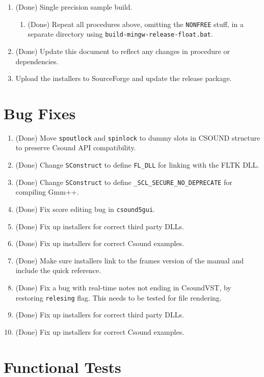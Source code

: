 \documentclass[11pt,letterpaper,onecolumn]{scrartcl}
\begin{document}
\begin{sloppypar}
\begin{enumerate}
\begin{enumerate}
\begin{enumerate}
				\end{enumerate}
			\item (Done) Single precision sample build.			
				\begin{enumerate}
					\item (Done) Repeat all procedures above, omitting the \verb|NONFREE| stuff, in a separate directory using \texttt{build-mingw-release-float.bat}. 
				\end{enumerate}
	    \item (Done) Update this document to reflect any changes in procedure or dependencies. 
	    \item Upload the installers to SourceForge and update the release package.
		\end{enumerate}
 \end{enumerate}

\section{Bug Fixes}
\label{sec:BugFixes}

\begin{enumerate}
	\item (Done) Move \texttt{spoutlock} and \texttt{spinlock} to dummy slots in CSOUND structure to preserve Csound API compatibility.
	\item (Done) Change \texttt{SConstruct} to define \verb|FL_DLL| for linking with the FLTK DLL.
	\item (Done) Change \texttt{SConstruct} to define \verb|_SCL_SECURE_NO_DEPRECATE| for compiling Gmm++.
	\item (Done) Fix score editing bug in \texttt{csound5gui}.
	\item (Done) Fix up installers for correct third party DLLs.
	\item (Done) Fix up installers for correct Csound examples.
	\item (Done) Make sure installers link to the frames version of the manual and include the quick reference.
	\item (Done) Fix a bug with real-time notes not ending in CsoundVST, by restoring \texttt{relesing} flag. This needs to be tested for file rendering.
	\item (Done) Fix up installers for correct third party DLLs.
	\item (Done) Fix up installers for correct Csound examples.
\end{enumerate}

\section{Functional Tests}
\label{sec:FunctionalTests}


\end{sloppypar}
\end{document}
